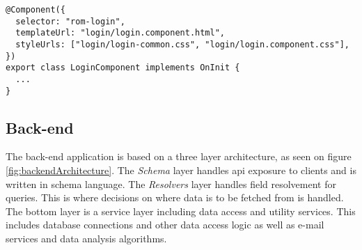 \begin{lstlisting}[caption=Login component declaration, label=lst:component]
@Component({
  selector: "rom-login",
  templateUrl: "login/login.component.html",
  styleUrls: ["login/login-common.css", "login/login.component.css"],
})
export class LoginComponent implements OnInit {
  ...
}
\end{lstlisting}

\subsection{Back-end}
The back-end application is based on a three layer architecture, as seen on figure \ref{fig:backendArchitecture}.
The \textit{Schema} layer handles \gls{api} exposure to clients and is written in  schema language.
The \textit{Resolvers} layer handles field resolvement for queries.
This is where decisions on where data is to be fetched from is handled.
The bottom layer is a service layer including data access and utility services.
This includes database connections and other data access logic as well as e-mail services and data analysis algorithms.

